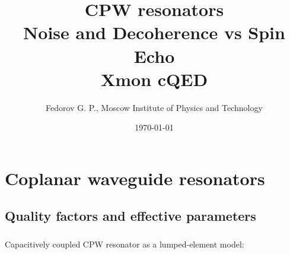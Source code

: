 \documentclass[aspectratio=169, 13pt]{beamer}
\title{CPW resonators\\Noise and Decoherence vs Spin Echo\\Xmon cQED}
\author{Fedorov G. P., Moscow Institute of Physics and Technology}
\date{\today}
\begin{document}
  
{
\begin{frame}[plain]
  \titlepage
\end{frame}
}


\frame[plain]{\tableofcontents}



\section{Coplanar waveguide resonators}
\subsection{Quality factors and effective parameters}
\begin{frame}[c]\frametitle{\secname}\framesubtitle{\subsecname}

Capacitively coupled CPW resonator as a lumped-element model: 

\vspace{0.5cm}
\begin{columns}[c]
\end{columns}
\end{frame}
\end{document}
